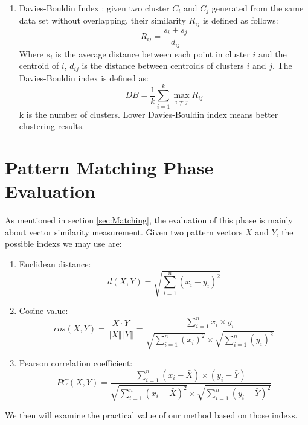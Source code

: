 \begin{enumerate}
    \item Davies-Bouldin Index \cite{davies1979cluster}: given two cluster $C_i$ and $C_j$ generated from the same data set without overlapping, their similarity $R_{ij}$ is defined as follows:
    \begin{equation}
        R_{ij} = \frac{s_i + s_j}{d_{ij}}
    \end{equation}
    Where $s_i$ is the average distance between each point in cluster $i$ and the centroid of $i$, $d_{ij}$ is the distance between centroids of clusters $i$ and $j$. The Davies-Bouldin index is defined as:
    \begin{equation}
        DB = \frac{1}{k} \sum_{i=1}^k\max_{i\neq j}R_{ij}
    \end{equation}
    k is the number of clusters. Lower Davies-Bouldin index means better clustering results.
\end{enumerate}

\section{Pattern Matching Phase Evaluation}
As mentioned in section \ref{sec:Matching}, the evaluation of this phase is mainly about vector similarity measurement. Given two pattern vectors $X$ and $Y$, the possible indexs we may use are:
\begin{enumerate}
    \item Euclidean distance:
    \begin{equation}
        d(X,Y) = \sqrt{\sum_{i=1}^n (x_i - y_i)^2}
    \end{equation}
    \item Cosine value: 
    \begin{equation}
        cos(X,Y) = \frac{X \cdot Y}{\Vert X \Vert \Vert Y \Vert} = \frac{\sum_{i=1}^n x_i \times y_i}{\sqrt{\sum_{i=1}^n(x_i)^2} \times \sqrt{\sum_{i=1}^n(y_i)^2}}
    \end{equation}
    \item Pearson correlation coefficient:
    \begin{equation}
        PC(X,Y) = \frac{\sum_{i=1}^n (x_i - \bar{X}) \times (y_i - \bar{Y}) }{ \sqrt{\sum_{i=1}^n (x_i - \bar{X}) ^2} \times\sqrt{\sum_{i=1}^n (y_i - \bar{Y}) ^2}}
    \end{equation}
\end{enumerate}
We then will examine the practical value of our method based on those indexs.
